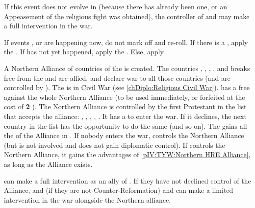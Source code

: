 
\phdipl
\aparag If this event does not evolve in  (because there has
already been one, or an Appeasement of the religious fight was obtained), the
controller of \paysBoheme and \paysPalatinat may make a full intervention in
the war.





\aparag If events ,  or
 are happening now, do not mark off and re-roll.
\aparag If there is a \GE, apply the .
\aparag If  has not yet happened, apply the
.
\aparag Else, apply .



\phevnt
\aparag A Northern Alliance of countries of the \HRE is created.  The
countries \paysOldenburg, \paysHanovre, \paysHesse, \paysHanse, and \paysBerg
breaks free from the \GE and are allied.
\aparag \GE and \hab declare war to all those countries (and are controlled by
\SPA). The \GE is in Civil War (see \ref{chDiplo:Religious Civil War}).
\bparag \AUS has a free \CB against the whole Northern Alliance (to be used
immediately, or forfeited at the cost of {\bf 2} \STAB).
\aparag The Northern Alliance is controlled by the first Protestant \MAJ in
the list that accepts the alliance: \HOL, \ENG, \SUE, \FRA, \POL.  It has a
\CB to enter the war. If it declines, the next country in the list has the
opportunity to do the same (and so on).  The \MAJ gains all the \MIN of the
Alliance in \EG.  If nobody enters the war, \SUE controls the Northern
Alliance (but is not involved and does not gain diplomatic control).
\aparag If \HOL controls the Northern Alliance, it gains the advantages of
\ref{pIV:TYW:Northern HRE Alliance}, as long as the Alliance exists.

\phdipl
\aparag \SPA can make a full intervention as an ally of \HAB.
\aparag If they have not declined control of the Alliance, \FRA and \ENG (if
they are not Counter-Reformation) and \SUE can make a limited intervention in
the war alongside the Northern alliance.

